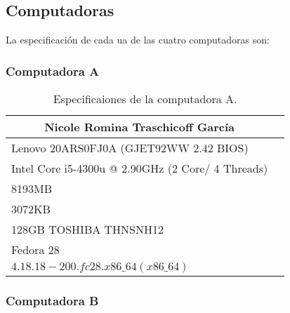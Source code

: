 \documentclass[12pt, letterpaper]{article}
\begin{document}
                \subsection{Computadoras}

                        \hspace{.5cm}
                        La especificación de cada ua de las cuatro computadoras 
                        son:

                        \subsubsection*{Computadora A}

                                \begin{table}[htb]
                                        \centering
                                        \begin{tabular}{|l|l|}
                                        \hline
                                                \multicolumn{1}{|c|}{Nicole Romina Traschicoff García} \\ 
                                                \hline \hline
                                                Lenovo 20ARS0FJ0A (GJET92WW 2.42 BIOS)  \\
                                                Intel Core i5-4300u @ 2.90GHz (2 Core/ 4 Threads) \\ 
                                                8193MB \\ 
                                                3072KB \\
                                                128GB TOSHIBA THNSNH12 \\
                                                Fedora $28$ \\ 
                                                $4.18.18-200.fc28.x86\_64(x86\_64)$ \\ 
                                                \hline
                                        \end{tabular}
                                        \caption{Especificaiones de la computadora A.}
                                \end{table}

                        \subsubsection*{Computadora B}
\end{document}
